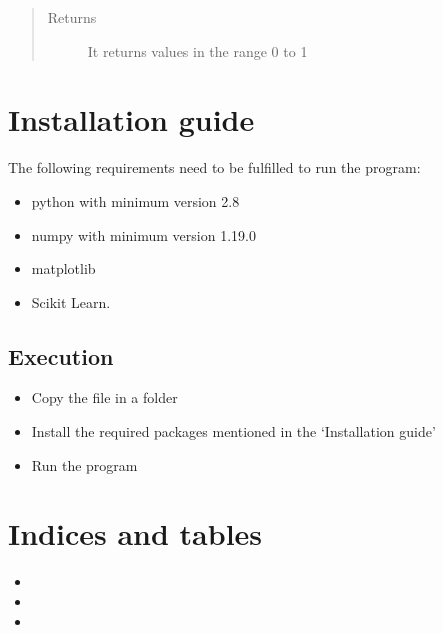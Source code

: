 \documentclass[letterpaper,10pt,english]{sphinxmanual}
\begin{document}
\begin{fulllineitems}
\begin{fulllineitems}
\begin{quote}
\begin{description}
\begin{itemize}
\end{itemize}

\item[{Returns}] \leavevmode
\sphinxAtStartPar
It returns values in the range 0 to 1

\end{description}\end{quote}

\end{fulllineitems}


\end{fulllineitems}



\chapter{Installation guide}
\label{\detokenize{index:installation-guide}}
\sphinxAtStartPar
The following requirements need to be fulfilled to run the program:
\begin{itemize}
\item {} 
\sphinxAtStartPar
python with minimum version 2.8

\item {} 
\sphinxAtStartPar
numpy with minimum version 1.19.0

\item {} 
\sphinxAtStartPar
matplotlib

\item {} 
\sphinxAtStartPar
Scikit Learn.

\end{itemize}


\section{Execution}
\label{\detokenize{index:execution}}\begin{itemize}
\item {} 
\sphinxAtStartPar
Copy the file in a folder

\item {} 
\sphinxAtStartPar
Install the required packages mentioned in the ‘Installation guide’

\item {} 
\sphinxAtStartPar
Run the program

\end{itemize}


\chapter{Indices and tables}
\label{\detokenize{index:indices-and-tables}}\begin{itemize}
\item {} 
\sphinxAtStartPar
{}

\item {} 
\sphinxAtStartPar
{}

\item {} 
\sphinxAtStartPar
{}

\end{itemize}
\end{document}
